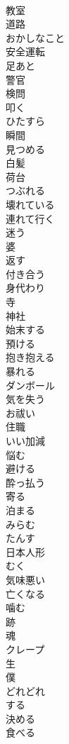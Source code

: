 \documentclass[8pt]{extreport}
\begin{document}
\begin{CJK}{UTF8}{min}
\\	教室
\\	道路
\\	おかしなこと
\\	安全運転
\\	足あと
\\	警官
\\	検問
\\	叩く
\\	ひたすら
\\	瞬間
\\	見つめる
\\	白髪
\\	荷台
\\	つぶれる
\\	壊れている
\\	連れて行く
\\	迷う
\\	婆
\\	返す
\\	付き合う
\\	身代わり
\\	寺
\\	神社
\\	始末する
\\	預ける
\\	抱き抱える
\\	暴れる
\\	ダンボール
\\	気を失う
\\	お祓い
\\	住職
\\	いい加減
\\	悩む
\\	避ける
\\	酔っ払う
\\	寄る
\\	泊まる
\\	みらむ
\\	たんす
\\	日本人形
\\	むく
\\	気味悪い
\\	亡くなる
\\	噛む
\\	跡
\\	魂
\\	クレープ
\\	生
\\	僕
\\	どれどれ
\\	する
\\	決める
\\	食べる

\end{CJK}
\end{document}
